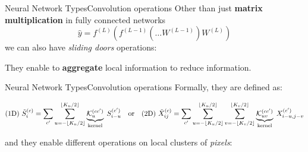 \begin{frame}{Neural Network Types}{Convolution operations}
    Other than just \textbf{matrix multiplication} in fully connected networks
    \begin{equation*}
        \hat{y} =
        f^{(L)}
        \left(
        f^{(L-1)}
        \left(
            \dots
            W^{(L-1)}
            \right)
        W^{(L)}
        \right)
    \end{equation*}
    we can also have \emph{sliding doors} operations:

    \begin{center}
        
    \end{center}

    \vfill

    They enable to \textbf{aggregate} local information to reduce information.
\end{frame}

\begin{frame}{Neural Network Types}{Convolution operations}
    Formally, they are defined as:

    \begin{equation*}
        \text{(1D)}~
        \tilde{S}^{(c)}_{i}
        =
        \sum\limits_{c^{\prime}}
        \sum\limits_{u = -\lfloor K_u/2 \rfloor}^{\lfloor K_u/2 \rfloor}
        \underbrace{\mathcal{K}^{(c c^{\prime})}_{u}}_{\text{kernel}}\;
        S^{(c^{\prime})}_{i-u}
        \qor \text{(2D)}~
        \tilde{X}^{(c)}_{ij}
        =
        \sum\limits_{c^{\prime}}
        \sum\limits_{u = -\lfloor K_u/2 \rfloor}^{\lfloor K_u/2 \rfloor}
        \sum\limits_{v = -\lfloor K_v/2 \rfloor}^{\lfloor K_v/2 \rfloor}
        \underbrace{\mathcal{K}^{(c c^{\prime})}_{uv}}_{\text{kernel}}\;
        X^{(c^{\prime})}_{i-u,j-v}
    \end{equation*}

    and they enable different operations on local clusters of \emph{pixels}:

    \begin{center}
        
    \end{center}
\end{frame}


